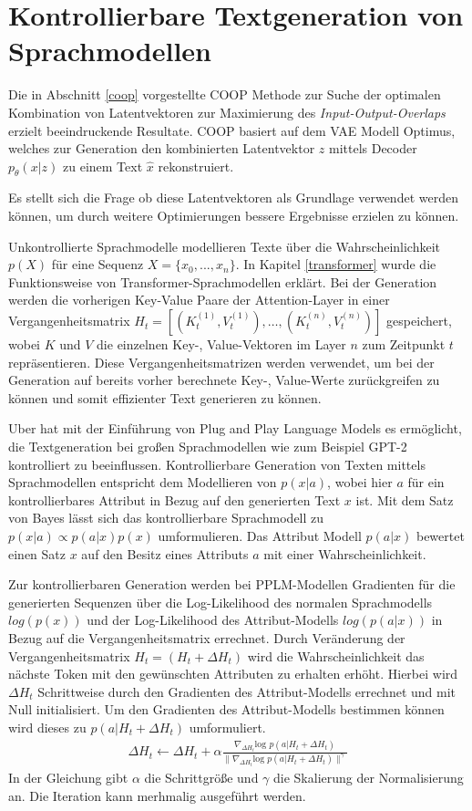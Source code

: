 \section{Kontrollierbare Textgeneration von Sprachmodellen}\raggedbottom
Die in Abschnitt \ref{coop} vorgestellte COOP Methode zur Suche der optimalen Kombination von Latentvektoren zur Maximierung des \textit{Input-Output-Overlaps} erzielt beeindruckende Resultate.
COOP basiert auf dem VAE Modell Optimus, welches zur Generation den kombinierten Latentvektor $z$ mittels Decoder $p_\theta(x|z)$ zu einem Text $\hat{x}$ rekonstruiert.

Es stellt sich die Frage ob diese Latentvektoren als Grundlage verwendet werden können, um durch weitere Optimierungen bessere Ergebnisse erzielen zu können.

Unkontrollierte Sprachmodelle modellieren Texte über die Wahrscheinlichkeit $p(X)$ für eine Sequenz $X=\{x_0,...,x_n\}$.
In Kapitel \ref{transformer} wurde die Funktionsweise von Transformer-Sprachmodellen erklärt. 
Bei der Generation werden die vorherigen Key-Value Paare der Attention-Layer in einer Vergangenheitsmatrix $H_t = [(K_t^{(1)},V_t^{(1)}), \ldots , (K_t^{(n)},V_t^{(n)})]$ gespeichert, wobei $K$ und $V$ die einzelnen Key-, Value-Vektoren im Layer $n$ zum Zeitpunkt $t$ repräsentieren. %
Diese Vergangenheitsmatrizen werden verwendet, um bei der Generation auf bereits vorher berechnete Key-, Value-Werte zurückgreifen zu können und somit effizienter Text generieren zu können.


Uber hat mit der Einführung von Plug and Play Language Models \citep{DBLP:journals/corr/abs-1912-02164} es ermöglicht, die Textgeneration bei großen Sprachmodellen wie zum Beispiel GPT-2 kontrolliert zu beeinflussen.
Kontrollierbare Generation von Texten mittels Sprachmodellen entspricht dem Modellieren von $p(x|a)$, wobei hier $a$ für ein kontrollierbares Attribut in Bezug auf den generierten Text $x$ ist. 
Mit dem Satz von Bayes lässt sich das kontrollierbare Sprachmodell zu $p(x|a)\propto p(a|x)p(x)$ umformulieren. 
Das Attribut Modell $p(a|x)$ bewertet einen Satz $x$ auf den Besitz eines Attributs $a$ mit einer Wahrscheinlichkeit.


Zur kontrollierbaren Generation werden bei PPLM-Modellen Gradienten für die generierten Sequenzen über die Log-Likelihood des normalen Sprachmodells $log(p(x))$ und der Log-Likelihood des Attribut-Modells $log(p(a|x))$ in Bezug auf die Vergangenheitsmatrix errechnet. 
Durch Veränderung der Vergangenheitsmatrix $H_t = (H_t+\Delta H_t)$ wird die Wahrscheinlichkeit das nächste Token mit den gewünschten Attributen zu erhalten erhöht. Hierbei wird $\Delta H_t$ Schrittweise durch den Gradienten des Attribut-Modells errechnet und mit Null initialisiert.
Um den Gradienten des Attribut-Modells bestimmen können wird dieses zu $p(a|H_t+\Delta H_t)$ umformuliert.
\begin{align*}
\Delta H_t \leftarrow \Delta H_t + \alpha \frac{\nabla_{\Delta H_t} \text{log }p(a|H_t+\Delta H_t)}{\| \nabla_{\Delta H_t} \text{log }p(a|H_t+\Delta H_t)\|^\gamma}
\end{align*}
In der Gleichung gibt $\alpha$ die Schrittgröße und $\gamma$ die Skalierung der Normalisierung an. Die Iteration kann merhmalig ausgeführt werden.

